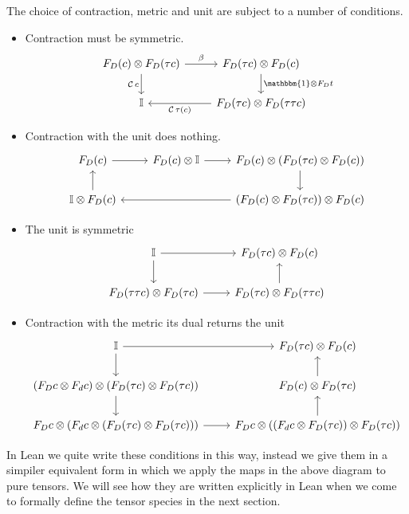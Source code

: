 \documentclass[a4paper, 11pt]{article}
\begin{document}
The choice of contraction, metric and unit are subject to a number of conditions.
\begin{itemize}
\item Contraction must be symmetric.
\begin{equation}
  \begin{tikzcd}
    F_D(c) \otimes F_D(\tau c) \arrow[r, "{\beta}"] \arrow[d, "{\mathcal{C}\, c}", swap] & F_D(\tau c) \otimes F_D (c) \arrow[d, "\mathbbm{1} \otimes F_D t"] \\
    \mathbb{I} & F_D(\tau c) \otimes F_D (\tau \tau c) \arrow[l, "{\mathcal{C}\, \tau(c)}", ] 
  \end{tikzcd}
  \end{equation}
  \item Contraction with the unit does nothing. 
  \begin{equation}
    \begin{tikzcd}
      F_D(c) \arrow[r] &  F_D(c) \otimes \mathbb{I} \arrow[r] & F_D(c) \otimes (F_D (\tau c) \otimes F_D(c)) \arrow[d] \\
      \mathbb{I} \otimes F_D(c) \arrow[u] &   &(F_D(c) \otimes F_D(\tau c)) \otimes F_D(c) \arrow[ll] 
  \end{tikzcd}
  \end{equation}
  \item The unit is symmetric 
  \begin{equation} 
    \begin{tikzcd}
      \mathbb{I} \arrow[r] \arrow[d] & F_D(\tau c) \otimes F_D(c) \\
      F_D(\tau \tau c) \otimes F_D(\tau c) \arrow[r] & F_D(\tau c) \otimes F_D(\tau \tau c) \arrow[u]
    \end{tikzcd}
  \end{equation}
  \item Contraction with the metric its dual returns the unit
  \begin{equation}
    \begin{tikzcd}
      \mathbb{I} \arrow[r] \arrow[d] & F_D(\tau c) \otimes F_D (c) \\ 
      (F_D c \otimes F_d c) \otimes (F_D (\tau c) \otimes F_D (\tau c) ) \arrow [d]  & F_D (c) \otimes F_D(\tau c) \arrow[u] \\ 
      F_D c \otimes (F_d c \otimes (F_D (\tau c) \otimes F_D (\tau c) )) \arrow [r] &  F_D c \otimes ((F_d c \otimes F_D (\tau c)) \otimes F_D (\tau c) ) \arrow[u]
    \end{tikzcd}
  \end{equation}
\end{itemize}
In Lean we quite write these conditions in this way, instead we give them in a simpiler equivalent form 
in which we apply the maps in the above diagram to pure tensors. We will see how they are 
written explicitly in Lean when we come to formally define the tensor species in the next section.
\end{document}

